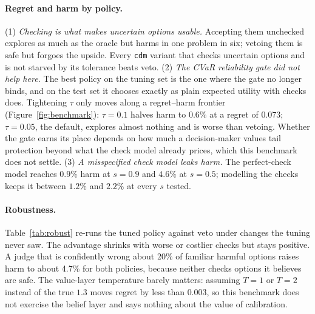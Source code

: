 \documentclass[11pt]{article}
\theoremstyle{definition}
\begin{document}
\paragraph{Regret and harm by policy.} (1) \emph{Checking is what makes uncertain options usable.} Accepting them
unchecked explores as much as the oracle but harms in one problem in six; vetoing them is safe but
forgoes the upside. Every \texttt{cdm} variant that checks uncertain options and is not starved by
its tolerance beats veto. (2) \emph{The CVaR reliability gate did not help here.} The best policy
on the tuning set is the one where the gate no longer binds, and on the test set it chooses exactly
as plain expected utility with checks does. Tightening $\tau$ only moves along a regret--harm
frontier (Figure~\ref{fig:benchmark}): $\tau=0.1$ halves harm to $0.6\%$ at a regret of $0.073$;
$\tau=0.05$, the default, explores almost nothing and is worse than vetoing. Whether the gate earns
its place depends on how much a decision-maker values tail protection beyond what the check model
already prices, which this benchmark does not settle. (3) \emph{A misspecified check model leaks
harm.} The perfect-check model reaches $0.9\%$ harm at $s=0.9$ and $4.6\%$ at $s=0.5$; modelling the
checks keeps it between $1.2\%$ and $2.2\%$ at every $s$ tested.

\paragraph{Robustness.} Table~\ref{tab:robust} re-runs the tuned policy against veto under changes
the tuning never saw. The advantage shrinks with worse or costlier checks but stays positive. A judge
that is confidently wrong about 20\% of familiar harmful options raises harm to about 4.7\% for both
policies, because neither checks options it believes are safe. The value-layer temperature barely
matters: assuming $T=1$ or $T=2$ instead of the true $1.3$ moves regret by less than $0.003$, so this
benchmark does not exercise the belief layer and says nothing about the value of calibration.
\end{document}
